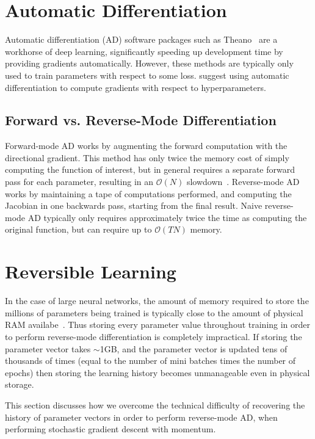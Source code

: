 \documentclass{article}
\newcommand{\numhypers}{N}
\newcommand{\numsteps}{T}
\begin{document}
\section{Automatic Differentiation}

Automatic differentiation (AD) software packages such as Theano~\cite{Bastien-Theano-2012, bergstra2010scipy} are a workhorse of deep learning, significantly speeding up development time by providing gradients automatically.
However, these methods are typically only used to train parameters with respect to some loss.
\cite{Autodiff14} suggest using automatic differentiation to compute gradients with respect to hyperparameters.

\subsection{Forward vs. Reverse-Mode Differentiation}

Forward-mode AD works by augmenting the forward computation with the directional gradient.
This method has only twice the memory cost of simply computing the function of interest, but in general requires a separate forward pass for each parameter, resulting in an $\mathcal{O}(\numhypers)$ slowdown~\cite{pearlmutter2008reverse}.
Reverse-mode AD works by maintaining a tape of computations performed, and computing the Jacobian in one backwards pass, starting from the final result.
Naive reverse-mode AD typically only requires approximately twice the time as computing the original function, but can require up to $\mathcal{O}(\numsteps\numhypers)$ memory.

\section{Reversible Learning}

In the case of large neural networks, the amount of memory required to store the millions of parameters being trained is typically close to the amount of physical RAM availabe~\cite{sequence2014}.
Thus storing every parameter value throughout training in order to perform reverse-mode differentiation is completely impractical.
If storing the parameter vector takes $\sim$1GB, and the parameter vector is updated tens of thousands of times (equal to the number of mini batches times the number of epochs) then storing the learning history becomes unmanageable even in physical storage.

This section discusses how we overcome the technical difficulty of recovering the history of parameter vectors in order to perform reverse-mode AD, when performing stochastic gradient descent with momentum.
\end{document}
